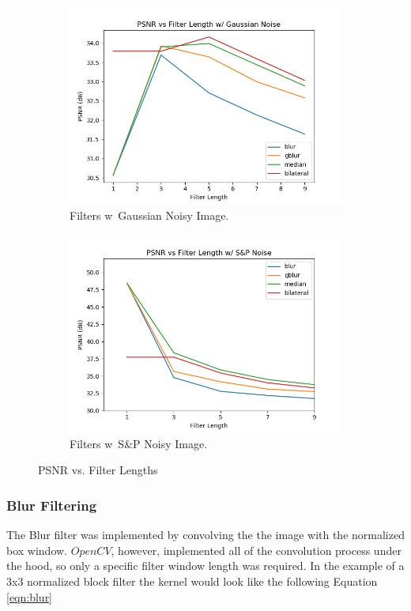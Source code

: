 \documentclass{article}\raggedbottom
\begin{document}
\begin{figure}[h!]
	\centering
	\begin{subfigure}[b]{0.45\linewidth}
		\includegraphics[width=\linewidth]{../../1_Resources/images/filter_length_g.png}
		\caption{Filters w\ Gaussian Noisy Image.}
	\end{subfigure}
	\begin{subfigure}[b]{0.45\linewidth}
		\includegraphics[width=\linewidth]{../../1_Resources/images/filter_length_sp.png}
		\caption{Filters w\ S\&P Noisy Image.}
	\end{subfigure}	
	\caption{PSNR vs. Filter Lengths}
	\label{fig:filter_length}
\end{figure}

\subsubsection{Blur Filtering}
The Blur filter was implemented by convolving the the image with the normalized box window. $OpenCV$, however, implemented all of the convolution process under the hood, so only a specific filter window length was required. In the example of a $3$x$3$ normalized block filter the kernel would look like the following Equation \eqref{eqn:blur}
\end{document}
